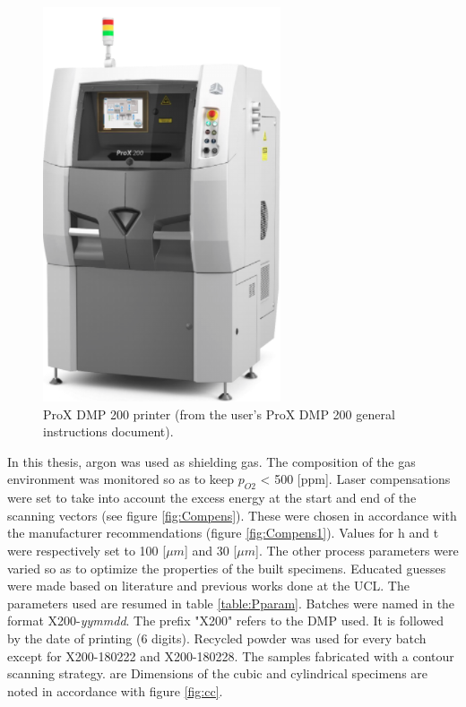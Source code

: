 \begin{figure}[th]
\centering
\includegraphics[scale=0.7]{Images/Printer}
\decoRule
\caption[ProX DMP 200 printer]{ProX DMP 200 printer (from the user's ProX DMP 200 general instructions document).}
\label{fig:Printer}
\end{figure}

In this thesis, argon was used as shielding gas. The composition of the gas environment was monitored so as to keep $p_{O2}$ < 500 [ppm]. Laser compensations were set to take into account the excess energy at the start and end of the scanning vectors (see figure \ref{fig:Compens}). These were chosen in accordance with the manufacturer recommendations (figure \ref{fig:Compens1}). Values for h and t were respectively set to 100 [$\mu m$] and 30 [$\mu m$]. The other process parameters were varied so as to optimize the properties of the built specimens. Educated guesses were made based on literature and previous works done at the UCL. The parameters used are resumed in table \ref{table:Pparam}. Batches were named in the format X200-\textit{yymmdd}. The prefix "X200" refers to the DMP used. It is followed by the date of printing (6 digits). Recycled powder was used for every batch except for X200-180222 and X200-180228. The samples fabricated with a contour scanning strategy. are Dimensions of the cubic and cylindrical specimens are noted in accordance with figure \ref{fig:cc}.\\


